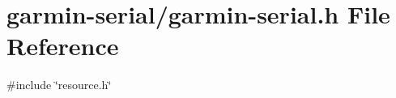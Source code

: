 \hypertarget{garmin-serial_8h}{
\section{garmin-\/serial/garmin-\/serial.h File Reference}
\label{garmin-serial_8h}
}
{\ttfamily \#include \char`\"{}resource.h\char`\"{}}\par
